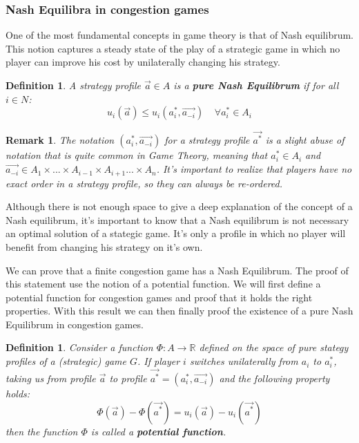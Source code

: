 \documentclass[a4paper,11pt]{article}
\newtheorem{definition}[theorem]{Definition}
\newtheorem{remark}[theorem]{Remark}
\newcommand{\R}{{\mathbb R}}
\begin{document}
\subsubsection{Nash Equilibra in congestion games}
One of the most fundamental concepts in game theory is that of Nash equilibrum. This notion captures a steady state of the play of a strategic game in which no player can improve his cost by unilaterally changing his strategy.

\begin{definition}\cite{6}
A strategy profile $\vec{a} \in A$ is a \textbf{pure Nash Equilibrum} if for all $i\in N$: 
$$u_i(\vec{a}) \leq u_i(a_i^{*}, \vec{a_{-i}}) \;\;\;\; \forall a_i^{*} \in A_i$$   
\end{definition}

\begin{remark}\label{herordening}
The notation $(a_i^*, \vec{a_{-i}})$ for a strategy profile $\vec{a^*}$ is a slight abuse of notation that is quite common in Game Theory, meaning that $a_i^* \in A_i$ and $\vec{a_{-i}} \in A_1\times ... \times A_{i-1} \times A_{i+1} ... \times A_n$. It's important to realize that players have no exact order in a strategy profile, so they can always be re-ordered.
\end{remark}

Although there is not enough space to give a deep explanation of the concept of a Nash equilibrum, it's important to know that a Nash equilibrum is not necessary an optimal solution of a stategic game. It's only a profile in which no player will benefit from changing his strategy on it's own.

We can prove that a finite congestion game has a Nash Equilibrum. The proof of this statement use the notion of a potential function. We will first define a potential function for congestion games and proof that it holds the right properties. With this result we can then finally proof the existence of a pure Nash Equilibrum in congestion games.

\begin{definition}
Consider a function $\Phi: A \rightarrow \R$  defined on the space of pure stategy profiles of a (strategic) game $G$. If player $i$ switches unilaterally from $a_i$ to $a_i^*$, taking us from profile $\vec{a}$ to profile $\vec{a^*}=(a_i^*, \vec{a_{-i}})$ and the following property holds:
$$\Phi(\vec{a}) - \Phi(\vec{a^*}) = u_i(\vec{a}) - u_i(\vec{a^*}) $$
then the function $\Phi$ is called a \textbf{potential function}.
\end{definition}
\end{document}
